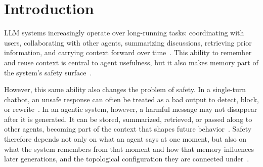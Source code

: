 \section{Introduction}
\label{sec:intro}
LLM systems increasingly operate over long-running tasks: coordinating with users, collaborating with other agents, summarizing discussions, retrieving prior information, and carrying context forward over time~\citep{wang2025recursively,wu-etal-2025-incremental,xi2025agentgym,kulkarni2024reinforcement}. This ability to remember and reuse context is central to agent usefulness, but it also makes memory part of the system's safety surface~\citep{wang-etal-2025-unveiling-privacy,kagaya2024rap}.

However, this same ability also changes the problem of safety. In a single-turn chatbot, an unsafe response can often be treated as a bad output to detect, block, or rewrite~\citep{shi2024large,chua2024ai}. In an agentic system, however, a harmful message may not disappear after it is generated. It can be stored, summarized, retrieved, or passed along to other agents, becoming part of the context that shapes future behavior~\citep{gao2024memory,rezazadeh2025collaborative}. Safety therefore depends not only on what an agent says at one moment, but also on what the system remembers from that moment and how that memory influences later generations, and the topological configuration they are connected under~\citep{yagoubi2026agentleak,Bajaj2026PositionSA}.

